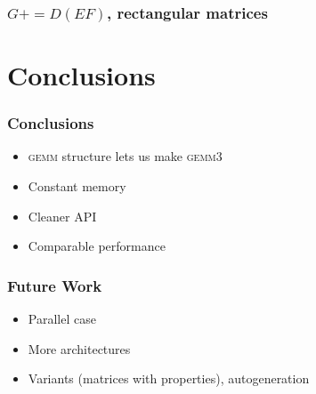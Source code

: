 \documentclass{beamer}
\newcommand*{\pluseq}{\mathrel{{+}{=}}}
\newcommand*{\gemmt}{{\textsc{gemm3}}}
\newcommand*{\gemm}{{\textsc{gemm}}}
\begin{document}
\begin{frame}
  \frametitle{$G \pluseq D(EF)$, rectangular matrices}
\end{frame}

\section{Conclusions}
\begin{frame}
  \frametitle{Conclusions}
  \begin{itemize}
  \item \gemm{} structure lets us make \gemmt{}
  \item Constant memory
  \item Cleaner API
  \item Comparable performance
  \end{itemize}
\end{frame}

\begin{frame}
  \frametitle{Future Work}
  \begin{itemize}
  \item Parallel case
  \item More architectures
  \item Variants (matrices with properties), autogeneration
  \end{itemize}
\end{frame}
\end{document}
